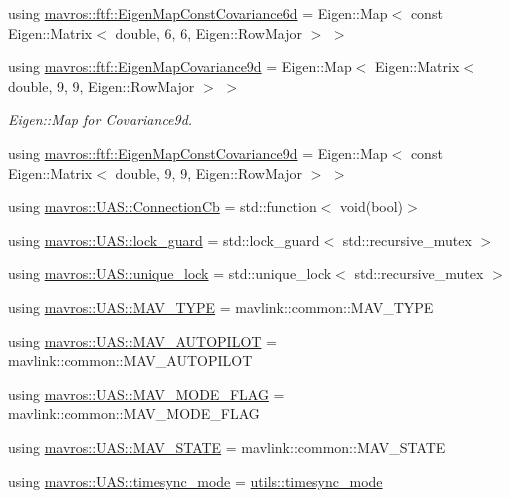 \begin{DoxyCompactItemize}
using \mbox{\hyperlink{group__nodelib_ga5e718b36aa6575dc90187729b5c96f4c}{mavros\+::ftf\+::\+Eigen\+Map\+Const\+Covariance6d}} = Eigen\+::\+Map$<$ const Eigen\+::\+Matrix$<$ double, 6, 6, Eigen\+::\+Row\+Major $>$ $>$
\item 
using \mbox{\hyperlink{group__nodelib_ga69e67d58da05f220a6e938fdccdf5a07}{mavros\+::ftf\+::\+Eigen\+Map\+Covariance9d}} = Eigen\+::\+Map$<$ Eigen\+::\+Matrix$<$ double, 9, 9, Eigen\+::\+Row\+Major $>$ $>$
\begin{DoxyCompactList}\small\item\em Eigen\+::\+Map for Covariance9d. \end{DoxyCompactList}\item 
using \mbox{\hyperlink{group__nodelib_ga74be5c2cc6a60a7c17ab1286a1106643}{mavros\+::ftf\+::\+Eigen\+Map\+Const\+Covariance9d}} = Eigen\+::\+Map$<$ const Eigen\+::\+Matrix$<$ double, 9, 9, Eigen\+::\+Row\+Major $>$ $>$
\item 
using \mbox{\hyperlink{group__nodelib_gae26d7ffaa66c0d7996857ca12600dab5}{mavros\+::\+U\+A\+S\+::\+Connection\+Cb}} = std\+::function$<$ void(bool)$>$
\item 
using \mbox{\hyperlink{group__nodelib_ga823ce64cc07d60ff4b1405ca4e4b4e89}{mavros\+::\+U\+A\+S\+::lock\+\_\+guard}} = std\+::lock\+\_\+guard$<$ std\+::recursive\+\_\+mutex $>$
\item 
using \mbox{\hyperlink{group__nodelib_ga8452368668995b87dd0cd51d4193c9ad}{mavros\+::\+U\+A\+S\+::unique\+\_\+lock}} = std\+::unique\+\_\+lock$<$ std\+::recursive\+\_\+mutex $>$
\item 
using \mbox{\hyperlink{group__nodelib_ga96b408110c3646b92bef49d32ed1c84b}{mavros\+::\+U\+A\+S\+::\+M\+A\+V\+\_\+\+T\+Y\+PE}} = mavlink\+::common\+::\+M\+A\+V\+\_\+\+T\+Y\+PE
\item 
using \mbox{\hyperlink{group__nodelib_gab6b5a708dff72c3923fd71d8d4730e3e}{mavros\+::\+U\+A\+S\+::\+M\+A\+V\+\_\+\+A\+U\+T\+O\+P\+I\+L\+OT}} = mavlink\+::common\+::\+M\+A\+V\+\_\+\+A\+U\+T\+O\+P\+I\+L\+OT
\item 
using \mbox{\hyperlink{group__nodelib_gaa4ceb4f80ab2af120df172fcb47a7d65}{mavros\+::\+U\+A\+S\+::\+M\+A\+V\+\_\+\+M\+O\+D\+E\+\_\+\+F\+L\+AG}} = mavlink\+::common\+::\+M\+A\+V\+\_\+\+M\+O\+D\+E\+\_\+\+F\+L\+AG
\item 
using \mbox{\hyperlink{group__nodelib_ga85bd5a7930c4de36d657e1f8b890e19f}{mavros\+::\+U\+A\+S\+::\+M\+A\+V\+\_\+\+S\+T\+A\+TE}} = mavlink\+::common\+::\+M\+A\+V\+\_\+\+S\+T\+A\+TE
\item 
using \mbox{\hyperlink{group__nodelib_ga866822300d407c623943a069e0db494a}{mavros\+::\+U\+A\+S\+::timesync\+\_\+mode}} = \mbox{\hyperlink{group__mavutils_gac7f53712a7627f397d0eb145c2a16cf7}{utils\+::timesync\+\_\+mode}}

\end{DoxyCompactItemize}
